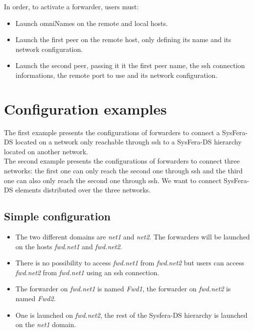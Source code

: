 \documentclass{report}
\begin{document}
\noindent In order, to activate a forwarder, users must:
\begin{itemize}
\item Launch omniNames on the remote and local hosts.
\item Launch the first peer on the remote host, only defining its name
  and its network configuration.
\item Launch the second peer, passing it it the first peer name, the
  ssh connection informations, the remote port to use and its network
  configuration.
\end{itemize}


\section*{Configuration examples}
\label{sec:ForwarderExamples}

The first example presents the configurations of forwarders to
connect a SysFera-DS \sed located on a network only reachable through ssh to a
SysFera-DS hierarchy located on another network.\\

The second example presents the configurations of forwarders to
connect three networks: the first one can only reach the second one
through ssh and the third one can also only reach the second one
through ssh. We want to connect SysFera-DS elements distributed over the
three networks.

\subsection*{Simple configuration}
\begin{itemize}
\item The two different domains are \textit{net1} and \textit{net2}. The forwarders will
  be launched on the hosts \textit{fwd.net1} and \textit{fwd.net2}.
\item There is no possibility to access \textit{fwd.net1} from
  \textit{fwd.net2} but users can access \textit{fwd.net2} from
  \textit{fwd.net1} using an ssh connection.
\item The forwarder on \textit{fwd.net1} is named \textit{Fwd1}, the
  forwarder on \textit{fwd.net2} is named \textit{Fwd2}.
\item One \sed is launched on \textit{fwd.net2}, the rest of the Sysfera-DS
  hierarchy is launched on the \textit{net1} domain.\\
\end{itemize}
\end{document}
